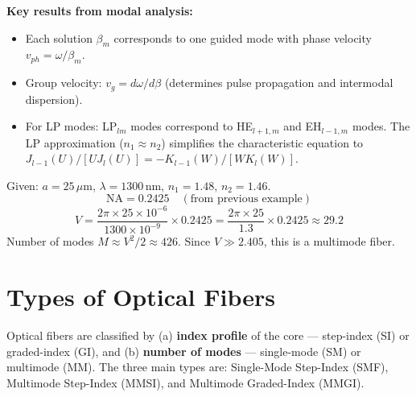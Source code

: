 \documentclass[12pt,a4paper]{article}
\begin{document}
\textbf{Key results from modal analysis:}
\begin{itemize}[leftmargin=*, itemsep=2pt]
  \item Each solution $\beta_m$ corresponds to one guided mode with phase velocity $v_{ph} = \omega/\beta_m$.
  \item Group velocity: $v_g = d\omega/d\beta$ (determines pulse propagation and intermodal dispersion).
  \item For LP modes: LP$_{lm}$ modes correspond to HE$_{l+1,m}$ and EH$_{l-1,m}$ modes. The LP approximation ($n_1 \approx n_2$) simplifies the characteristic equation to $J_{l-1}(U) / [U J_l(U)] = -K_{l-1}(W)/[W K_l(W)]$.
\end{itemize}

\begin{tcolorbox}[examplebox, title={\textbf{Worked Example: V-Number and Mode Count}}]
Given: $a = 25\,\mu$m, $\lambda = 1300\,$nm, $n_1 = 1.48$, $n_2 = 1.46$.
\[
\text{NA} = 0.2425 \quad (\text{from previous example})
\]
\[
V = \frac{2\pi \times 25\times10^{-6}}{1300\times10^{-9}} \times 0.2425 = \frac{2\pi \times 25}{1.3} \times 0.2425 \approx 29.2
\]
Number of modes $M \approx V^2/2 \approx 426$. Since $V \gg 2.405$, this is a multimode fiber.
\end{tcolorbox}

\section{Types of Optical Fibers}

\begin{tcolorbox}[defbox, title={\textbf{Classification of Optical Fibers}}]
Optical fibers are classified by (a) \textbf{index profile} of the core --- step-index (SI) or graded-index (GI), and (b) \textbf{number of modes} --- single-mode (SM) or multimode (MM). The three main types are: Single-Mode Step-Index (SMF), Multimode Step-Index (MMSI), and Multimode Graded-Index (MMGI).
\end{tcolorbox}
\end{document}
